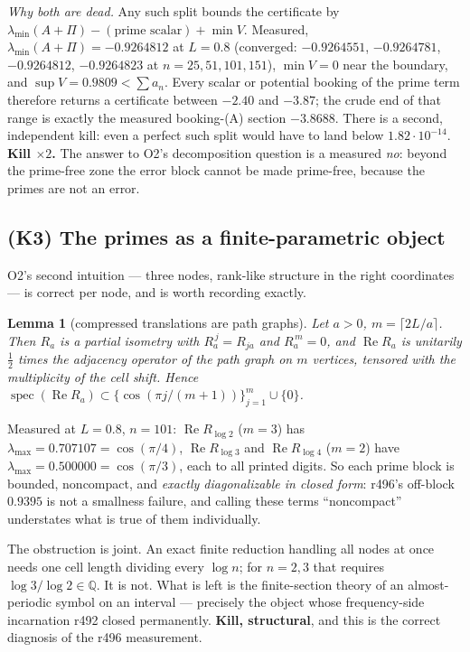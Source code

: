 \documentclass[11pt]{article}
\newtheorem{lemma}{Lemma}
\theoremstyle{remark}
\begin{document}
\emph{Why both are dead.}  Any such split bounds the certificate by
$\lambda_{\min}(A+\Pi)-(\text{prime scalar})+\min V$.  Measured,
$\lambda_{\min}(A+\Pi)=-0.9264812$ at $L=0.8$ (converged:
$-0.9264551$, $-0.9264781$, $-0.9264812$, $-0.9264823$ at
$n=25,51,101,151$), $\min V=0$ near the boundary, and
$\sup V=0.9809<\sum a_n$.  Every scalar or potential booking of the
prime term therefore returns a certificate between $-2.40$ and
$-3.87$; the crude end of that range is exactly the measured
booking-(A) section $-3.8688$.
There is a second, independent kill: even a perfect such split would
have to land below $1.82\cdot10^{-14}$.
\textbf{Kill $\times2$.}  The answer to O2's decomposition question is
a measured \emph{no}: beyond the prime-free zone the error block
cannot be made prime-free, because the primes are not an error.

\subsection{(K3) The primes as a finite-parametric object}\label{sec:k3}

O2's second intuition --- three nodes, rank-like structure in the
right coordinates --- is correct per node, and is worth recording
exactly.

\begin{lemma}[compressed translations are path graphs]\label{lem:path}
Let $a>0$, $m=\lceil 2L/a\rceil$.  Then $R_a$ is a partial isometry
with $R_a^{\,j}=R_{ja}$ and $R_a^{\,m}=0$, and
$\operatorname{Re}R_a$ is unitarily $\tfrac12$ times the adjacency
operator of the path graph on $m$ vertices, tensored with the
multiplicity of the cell shift.  Hence
$\operatorname{spec}(\operatorname{Re}R_a)
 \subset\{\cos(\pi j/(m+1))\}_{j=1}^{m}\cup\{0\}$.
\end{lemma}

Measured at $L=0.8$, $n=101$: $\operatorname{Re}R_{\log2}$
($m=3$) has $\lambda_{\max}=0.707107=\cos(\pi/4)$,
$\operatorname{Re}R_{\log3}$ and $\operatorname{Re}R_{\log4}$
($m=2$) have $\lambda_{\max}=0.500000=\cos(\pi/3)$, each to all
printed digits.  So each prime block is bounded, noncompact, and
\emph{exactly diagonalizable in closed form}: r496's off-block
$0.9395$ is not a smallness failure, and calling these terms
``noncompact'' understates what is true of them individually.

The obstruction is joint.  An exact finite reduction handling all
nodes at once needs one cell length dividing every $\log n$; for
$n=2,3$ that requires $\log3/\log2\in\mathbb Q$.  It is not.  What is
left is the finite-section theory of an almost-periodic symbol on an
interval --- precisely the object whose frequency-side incarnation
r492 closed permanently.  \textbf{Kill, structural}, and this is the
correct diagnosis of the r496 measurement.
\end{document}
